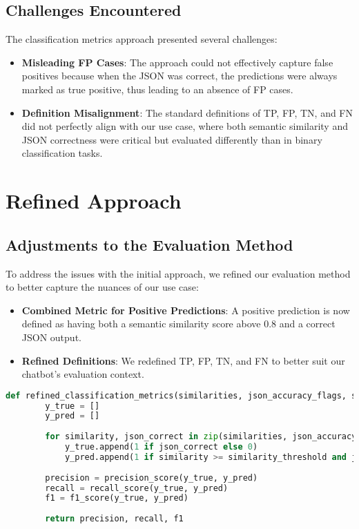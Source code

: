 \subsection{Challenges Encountered}

The classification metrics approach presented several challenges:
\begin{itemize}
    \item \textbf{Misleading FP Cases}: The approach could not effectively capture false positives because when the JSON was correct, the predictions were always marked as true positive, thus leading to an absence of FP cases.
    \item \textbf{Definition Misalignment}: The standard definitions of TP, FP, TN, and FN did not perfectly align with our use case, where both semantic similarity and JSON correctness were critical but evaluated differently than in binary classification tasks.
\end{itemize}

\section{Refined Approach}

\subsection{Adjustments to the Evaluation Method}

To address the issues with the initial approach, we refined our evaluation method to better capture the nuances of our use case:
\begin{itemize}
    \item \textbf{Combined Metric for Positive Predictions}: A positive prediction is now defined as having both a semantic similarity score above 0.8 and a correct JSON output.
    \item \textbf{Refined Definitions}: We redefined TP, FP, TN, and FN to better suit our chatbot's evaluation context.
\end{itemize}

\begin{lstlisting}[language=Python, caption=Refined Classification Metrics]
    def refined_classification_metrics(similarities, json_accuracy_flags, similarity_threshold=0.8):
        y_true = []
        y_pred = []
    
        for similarity, json_correct in zip(similarities, json_accuracy_flags):
            y_true.append(1 if json_correct else 0)
            y_pred.append(1 if similarity >= similarity_threshold and json_correct else 0)
    
        precision = precision_score(y_true, y_pred)
        recall = recall_score(y_true, y_pred)
        f1 = f1_score(y_true, y_pred)
    
        return precision, recall, f1
\end{lstlisting}

